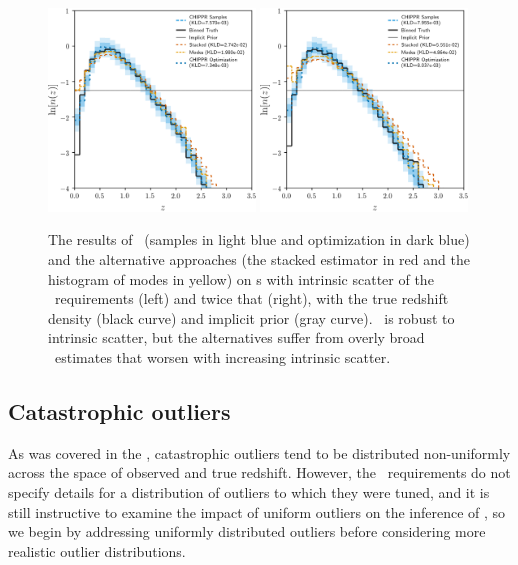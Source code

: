 \begin{figure}
	\includegraphics[width=0.49\textwidth]{figures/chippr/results_scatter1.png}
	\includegraphics[width=0.49\textwidth]{figures/chippr/results_scatter2.png}
	\caption{
		The results of \Chippr\ (samples in light blue and optimization in dark blue) and the alternative approaches (the stacked estimator in red and the histogram of modes in yellow) on \pzpdf s with intrinsic scatter of the \lsst\ requirements (left) and twice that (right), with the true redshift density (black curve) and implicit prior (gray curve).
		\Chippr\ is robust to intrinsic scatter, but the alternatives suffer from overly broad \nz\ estimates that worsen with increasing intrinsic scatter.
	}
\end{figure}

\subsection{Catastrophic outliers}

As was covered in the , catastrophic outliers tend to be distributed non-uniformly across the space of observed and true redshift.
However, the \lsst\ requirements do not specify details for a distribution of outliers to which they were tuned, and it is still instructive to examine the impact of uniform outliers on the inference of \nz, so we begin by addressing uniformly distributed outliers before considering more realistic outlier distributions.

